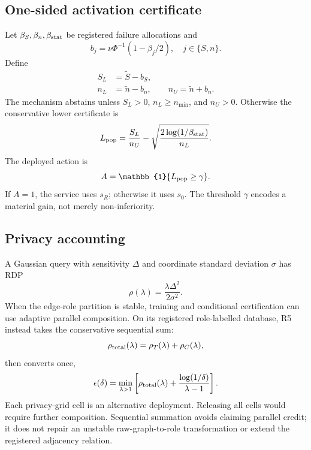\subsection{One-sided activation certificate}

Let $\beta_S,\beta_n,\beta_{\rm stat}$ be registered failure allocations and
\begin{equation}
 b_j=\nu\Phi^{-1}(1-\beta_j/2),\quad j\in\{S,n\}.
\end{equation}
Define
\begin{align}
 S_L&=\widetilde S-b_S,\\
 n_L&=\widetilde n-b_n,\qquad n_U=\widetilde n+b_n.
\end{align}
The mechanism abstains unless $S_L>0$, $n_L\geq n_{\min}$, and $n_U>0$.
Otherwise the conservative lower certificate is
\begin{equation}
 L_{\rm pop}
 =\frac{S_L}{n_U}
 -\sqrt{\frac{2\log(1/\beta_{\rm stat})}{n_L}}.
\label{eq:certificate}
\end{equation}
The deployed action is
\begin{equation}
 A=\mathbb{1}\{L_{\rm pop}\geq\gamma\}.
\end{equation}
If $A=1$, the service uses $s_R$; otherwise it uses $s_0$. The threshold
$\gamma$ encodes a material gain, not merely non-inferiority.

\subsection{Privacy accounting}

A Gaussian query with sensitivity $\Delta$ and coordinate standard deviation
$\sigma$ has RDP \cite{mironov2017rdp}
\begin{equation}
 \rho(\lambda)=\frac{\lambda\Delta^2}{2\sigma^2}.
\end{equation}
When the edge-role partition is stable, training and conditional
certification can use adaptive parallel composition. On its registered
role-labelled database, R5 instead takes the conservative sequential sum:
\begin{equation}
 \rho_{\rm total}(\lambda)
 =\rho_T(\lambda)+\rho_C(\lambda),
\end{equation}
then converts once,
\begin{equation}
 \epsilon(\delta)=\min_{\lambda>1}
 \left[
 \rho_{\rm total}(\lambda)
 {}+\frac{\log(1/\delta)}{\lambda-1}
 \right].
\label{eq:rdpconversion}
\end{equation}
Each privacy-grid cell is an alternative deployment. Releasing all cells would
require further composition. Sequential summation avoids claiming parallel
credit; it does not repair an unstable raw-graph-to-role transformation or
extend the registered adjacency relation.
